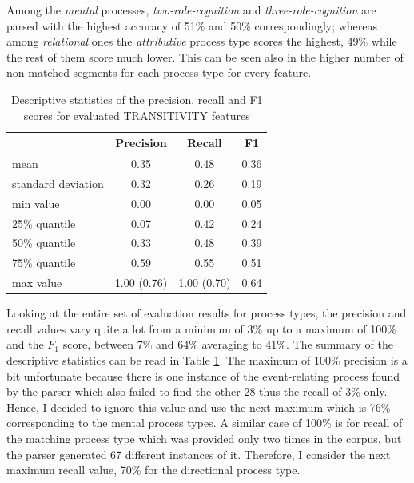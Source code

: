     Among the \textit{mental} processes, \textit{two-role-cognition} and \textit{three-role-cognition} are parsed with the highest accuracy of 51\% and 50\% correspondingly; whereas among \textit{relational} ones the \textit{attributive} process type scores the highest, 49\% while the rest of them score much lower. This can be seen also in the higher number of  non-matched segments for each process type for every feature.
    
    \begin{table}[!ht]
    \centering
    \begin{tabular}{lccc}
        \toprule
        {} & {Precision} & {Recall} & {F1} \\ %
        \midrule
        mean & 0.35 & 0.48 & 0.36 \\
        standard deviation & 0.32 & 0.26 & 0.19 \\
        min value & 0.00 & 0.00 & 0.05 \\
        25\% quantile & 0.07 & 0.42 & 0.24 \\
        50\% quantile & 0.33 & 0.48 & 0.39 \\
        75\% quantile & 0.59 & 0.55 & 0.51 \\
        max value & 1.00 (0.76) & 1.00 (0.70) & 0.64 \\
        \bottomrule
    \end{tabular}
    \caption{Descriptive statistics of the precision, recall and F1 scores for evaluated TRANSITIVITY features}
    \label{tab:transitivity-accuracy}
    \end{table}
    
    Looking at the entire set of evaluation results for process types, the precision and recall values vary quite a lot from a minimum of 3\% up to a maximum of 100\% and the $F_1$ score, between 7\% and 64\%  averaging to 41\%. The summary of the descriptive statistics can be read in Table \ref{tab:transitivity-accuracy}. The maximum of 100\% precision is a bit unfortunate because there is one instance of the event-relating process found by the parser which also failed to find the other 28 thus the recall of 3\% only. Hence, I decided to ignore this value and use the next maximum which is 76\% corresponding to the mental process types. A similar case of 100\% is for recall of the matching process type which was provided only two times in the corpus, but the parser generated 67 different instances of it. Therefore, I consider the next maximum recall value, 70\%  for the directional process type. 
    
